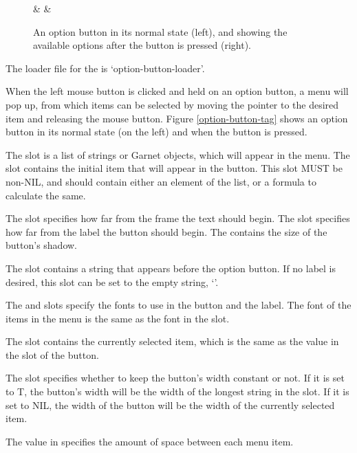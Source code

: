 \tabclear
{}
\begin{figure}
 &  & 
\caption{An option button in its normal state (left), and showing the
available options after the button is pressed (right).}
\end{figure}

The loader file for the  is `option-button-loader'.

When the left mouse button
is clicked and held on an option button, a menu will pop up, from
which items can be selected by moving the pointer to the desired item
and releasing the mouse button.
Figure \ref{option-button-tag} shows an option button in its normal
state (on the left) and when the button is pressed.

The  slot is a list of strings or Garnet objects, which will
appear in the menu.  The  slot contains the initial item
that will appear in the button.  This slot MUST be non-NIL, and should contain
either an element of the  list, or a formula to calculate the same.

The  slot specifies how far from the frame the text should
begin.  The slot  specifies how far from the label the
button should begin.  The  contains the size of the
button's shadow.

The  slot contains a string that appears before the option
button.  If no label is desired, this slot can be set to the empty string, `'.

The  and  slots specify the fonts to use
in the button and the label.  The font of the items in the menu is the
same as the font in the  slot.

The  slot contains the currently selected item, which is the
same as the value in the  slot of the button.

The  slot specifies whether to keep the button's
width constant or not.  If it is set to T, the button's width will be
the width of the longest string in the  slot.  If it is set to
NIL, the width of the button will be the width of the currently
selected item.

The value in  specifies the amount of space between each menu
item.

